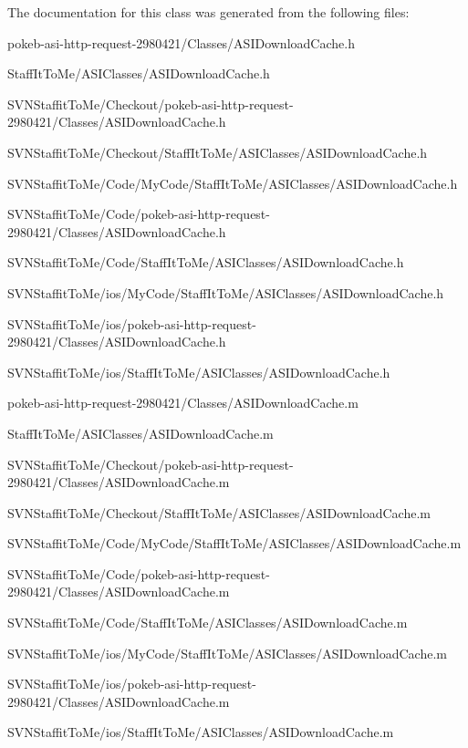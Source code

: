 \-The documentation for this class was generated from the following files\-:\begin{DoxyCompactItemize}
\item 
pokeb-\/asi-\/http-\/request-\/2980421/\-Classes/\-A\-S\-I\-Download\-Cache.\-h\item 
\-Staff\-It\-To\-Me/\-A\-S\-I\-Classes/\-A\-S\-I\-Download\-Cache.\-h\item 
\-S\-V\-N\-Staffit\-To\-Me/\-Checkout/pokeb-\/asi-\/http-\/request-\/2980421/\-Classes/\-A\-S\-I\-Download\-Cache.\-h\item 
\-S\-V\-N\-Staffit\-To\-Me/\-Checkout/\-Staff\-It\-To\-Me/\-A\-S\-I\-Classes/\-A\-S\-I\-Download\-Cache.\-h\item 
\-S\-V\-N\-Staffit\-To\-Me/\-Code/\-My\-Code/\-Staff\-It\-To\-Me/\-A\-S\-I\-Classes/\-A\-S\-I\-Download\-Cache.\-h\item 
\-S\-V\-N\-Staffit\-To\-Me/\-Code/pokeb-\/asi-\/http-\/request-\/2980421/\-Classes/\-A\-S\-I\-Download\-Cache.\-h\item 
\-S\-V\-N\-Staffit\-To\-Me/\-Code/\-Staff\-It\-To\-Me/\-A\-S\-I\-Classes/\-A\-S\-I\-Download\-Cache.\-h\item 
\-S\-V\-N\-Staffit\-To\-Me/ios/\-My\-Code/\-Staff\-It\-To\-Me/\-A\-S\-I\-Classes/\-A\-S\-I\-Download\-Cache.\-h\item 
\-S\-V\-N\-Staffit\-To\-Me/ios/pokeb-\/asi-\/http-\/request-\/2980421/\-Classes/\-A\-S\-I\-Download\-Cache.\-h\item 
\-S\-V\-N\-Staffit\-To\-Me/ios/\-Staff\-It\-To\-Me/\-A\-S\-I\-Classes/\-A\-S\-I\-Download\-Cache.\-h\item 
pokeb-\/asi-\/http-\/request-\/2980421/\-Classes/\-A\-S\-I\-Download\-Cache.\-m\item 
\-Staff\-It\-To\-Me/\-A\-S\-I\-Classes/\-A\-S\-I\-Download\-Cache.\-m\item 
\-S\-V\-N\-Staffit\-To\-Me/\-Checkout/pokeb-\/asi-\/http-\/request-\/2980421/\-Classes/\-A\-S\-I\-Download\-Cache.\-m\item 
\-S\-V\-N\-Staffit\-To\-Me/\-Checkout/\-Staff\-It\-To\-Me/\-A\-S\-I\-Classes/\-A\-S\-I\-Download\-Cache.\-m\item 
\-S\-V\-N\-Staffit\-To\-Me/\-Code/\-My\-Code/\-Staff\-It\-To\-Me/\-A\-S\-I\-Classes/\-A\-S\-I\-Download\-Cache.\-m\item 
\-S\-V\-N\-Staffit\-To\-Me/\-Code/pokeb-\/asi-\/http-\/request-\/2980421/\-Classes/\-A\-S\-I\-Download\-Cache.\-m\item 
\-S\-V\-N\-Staffit\-To\-Me/\-Code/\-Staff\-It\-To\-Me/\-A\-S\-I\-Classes/\-A\-S\-I\-Download\-Cache.\-m\item 
\-S\-V\-N\-Staffit\-To\-Me/ios/\-My\-Code/\-Staff\-It\-To\-Me/\-A\-S\-I\-Classes/\-A\-S\-I\-Download\-Cache.\-m\item 
\-S\-V\-N\-Staffit\-To\-Me/ios/pokeb-\/asi-\/http-\/request-\/2980421/\-Classes/\-A\-S\-I\-Download\-Cache.\-m\item 
\-S\-V\-N\-Staffit\-To\-Me/ios/\-Staff\-It\-To\-Me/\-A\-S\-I\-Classes/\-A\-S\-I\-Download\-Cache.\-m\end{DoxyCompactItemize}
